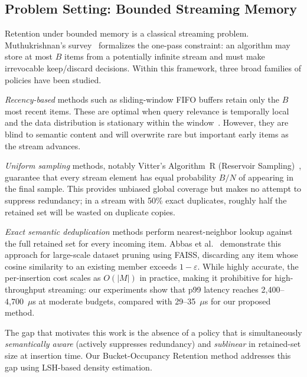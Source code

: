 \documentclass[conference]{IEEEtran}
\begin{document}
\subsection{Problem Setting: Bounded Streaming Memory}
Retention under bounded memory is a classical streaming problem.
Muthukrishnan's survey~\cite{b8} formalizes the one-pass constraint: an
algorithm may store at most $B$ items from a potentially infinite stream and
must make irrevocable keep/discard decisions. Within this framework, three
broad families of policies have been studied.

\textit{Recency-based} methods such as sliding-window FIFO buffers retain
only the $B$ most recent items. These are optimal when query relevance
is temporally local and the data distribution is stationary within the
window~\cite{b9}. However, they are blind to semantic content and will
overwrite rare but important early items as the stream advances.

\textit{Uniform sampling} methods, notably Vitter's Algorithm~R
(Reservoir Sampling)~\cite{b10}, guarantee that every stream element has
equal probability $B/N$ of appearing in the final sample. This provides
unbiased global coverage but makes no attempt to suppress redundancy; in
a stream with 50\% exact duplicates, roughly half the retained set will
be wasted on duplicate copies.

\textit{Exact semantic deduplication} methods perform nearest-neighbor
lookup against the full retained set for every incoming item. Abbas et
al.~\cite{b11} demonstrate this approach for large-scale dataset pruning
using FAISS, discarding any item whose cosine similarity to an existing
member exceeds $1-\varepsilon$. While highly accurate, the per-insertion
cost scales as $O(|M|)$ in practice, making it prohibitive for
high-throughput streaming: our experiments show that p99 latency reaches
2,400--4,700~$\mu$s at moderate budgets, compared with 29--35~$\mu$s
for our proposed method.

The gap that motivates this work is the absence of a policy that is
simultaneously \emph{semantically aware} (actively suppresses redundancy)
and \emph{sublinear} in retained-set size at insertion time. Our
Bucket-Occupancy Retention method addresses this gap using LSH-based
density estimation.
\end{document}
